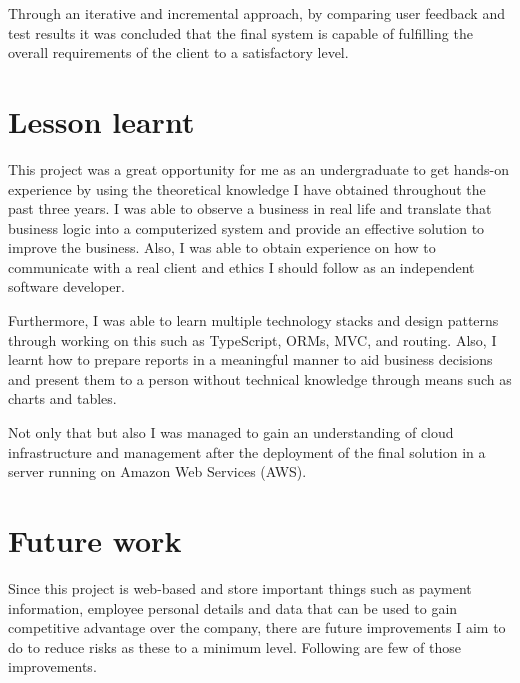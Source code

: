 \documentclass[12pt]{report}
\begin{document}
Through an iterative and incremental approach, by comparing user feedback and test results it was concluded that the final system is capable of fulfilling the overall requirements of the client to a satisfactory level.

\section{Lesson learnt}
This project was a great opportunity for me as an undergraduate to get hands-on experience by using the theoretical knowledge I have obtained throughout the past three years. I was able to observe a business in real life and translate that business logic into a computerized system and provide an effective solution to improve the business. Also, I was able to obtain experience on how to communicate with a real client and ethics I should follow as an independent software developer.

Furthermore, I was able to learn multiple technology stacks and design patterns through working on this such as TypeScript, ORMs, MVC, and routing. Also, I learnt how to prepare reports in a meaningful manner to aid business decisions and present them to a person without technical knowledge through means such as charts and tables.

Not only that but also I was managed to gain an understanding of cloud infrastructure and management after the deployment of the final solution in a server running on Amazon Web Services (AWS).

\section{Future work}
Since this project is web-based and store important things such as payment information, employee personal details and data that can be used to gain competitive advantage over the company, there are future improvements I aim to do to reduce risks as these to a minimum level. Following are few of those improvements.
\end{document}
